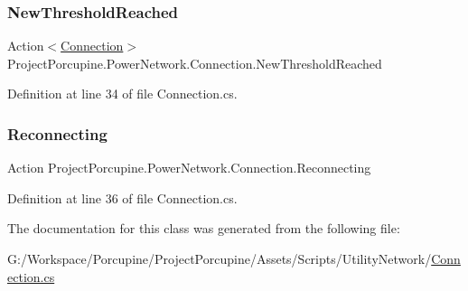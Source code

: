 \subsubsection{\texorpdfstring{New\+Threshold\+Reached}{NewThresholdReached}}
{\footnotesize\ttfamily Action$<$\hyperlink{class_project_porcupine_1_1_power_network_1_1_connection}{Connection}$>$ Project\+Porcupine.\+Power\+Network.\+Connection.\+New\+Threshold\+Reached}



Definition at line 34 of file Connection.\+cs.

\mbox{\label{class_project_porcupine_1_1_power_network_1_1_connection_a71ac81543bd631d64e28455bf799599d}} 
\subsubsection{\texorpdfstring{Reconnecting}{Reconnecting}}
{\footnotesize\ttfamily Action Project\+Porcupine.\+Power\+Network.\+Connection.\+Reconnecting}



Definition at line 36 of file Connection.\+cs.



The documentation for this class was generated from the following file\+:\begin{DoxyCompactItemize}
\item 
G\+:/\+Workspace/\+Porcupine/\+Project\+Porcupine/\+Assets/\+Scripts/\+Utility\+Network/\hyperlink{_connection_8cs}{Connection.\+cs}\end{DoxyCompactItemize}
